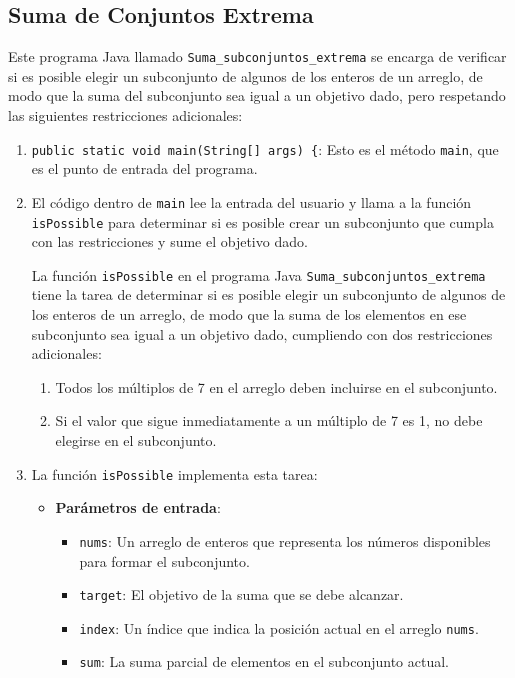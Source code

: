 \documentclass{article}
\begin{document}
	\subsection{Suma de Conjuntos Extrema}
 Este programa Java llamado \texttt{Suma\_subconjuntos\_extrema} se encarga de verificar si es posible elegir un subconjunto de algunos de los enteros de un arreglo, de modo que la suma del subconjunto sea igual a un objetivo dado, pero respetando las siguientes restricciones adicionales:




\begin{enumerate}
  \item \texttt{public static void main(String[] args) \{}: Esto es el método \texttt{main}, que es el punto de entrada del programa.
  
  \item El código dentro de \texttt{main} lee la entrada del usuario y llama a la función \texttt{isPossible} para determinar si es posible crear un subconjunto que cumpla con las restricciones y sume el objetivo dado.
  
La función \texttt{isPossible} en el programa Java \texttt{Suma\_subconjuntos\_extrema} tiene la tarea de determinar si es posible elegir un subconjunto de algunos de los enteros de un arreglo, de modo que la suma de los elementos en ese subconjunto sea igual a un objetivo dado, cumpliendo con dos restricciones adicionales:

\begin{enumerate}
  \item Todos los múltiplos de 7 en el arreglo deben incluirse en el subconjunto.
  \item Si el valor que sigue inmediatamente a un múltiplo de 7 es 1, no debe elegirse en el subconjunto.
\end{enumerate}


\item La función \texttt{isPossible} implementa esta tarea:
\begin{itemize}
  \item \textbf{Parámetros de entrada}:
    \begin{itemize}
      \item \texttt{nums}: Un arreglo de enteros que representa los números disponibles para formar el subconjunto.
      \item \texttt{target}: El objetivo de la suma que se debe alcanzar.
      \item \texttt{index}: Un índice que indica la posición actual en el arreglo \texttt{nums}.
      \item \texttt{sum}: La suma parcial de elementos en el subconjunto actual.
    \end{itemize}
  

\end{itemize}
\end{enumerate}
\end{document}
